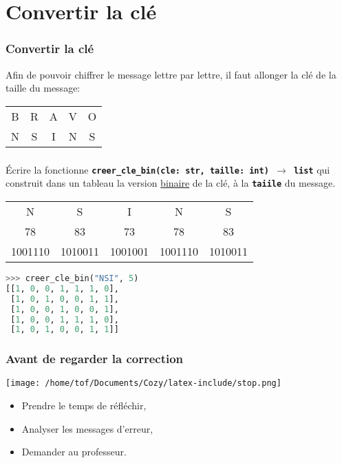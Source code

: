 \documentclass[svgnames,11pt]{beamer}
\begin{document}
\section{Convertir la clé}
\begin{frame}
    \frametitle{Convertir la clé}

    Afin de pouvoir chiffrer le message lettre par lettre, il faut allonger la clé de la taille du message:
    \begin{center}
        \begin{tabular}{*{5}{c}}
            B&R&A&V&O\\
            N&S&I&N&S\\
        \end{tabular}
    \end{center}
\end{frame}
\begin{frame}[fragile]
    \frametitle{}

    \begin{activite}
    Écrire la fonctionne \textbf{\texttt{creer\_cle\_bin(cle: str, taille: int) $\rightarrow$ list}} qui construit dans un tableau la version \underline{binaire} de la clé, à la \textbf{\texttt{taiile}} du message.
    \end{activite}
    \begin{center}
        \begin{tabular}{*{5}{c}}
            N&S&I&N&S\\
    
            78&83&73&78&83\\
            1001110&1010011&1001001&1001110&1010011\\
        \end{tabular}
\begin{lstlisting}[language=Python , basicstyle=\ttfamily\small, xleftmargin=0.2em, xrightmargin=0em]
>>> creer_cle_bin("NSI", 5)
[[1, 0, 0, 1, 1, 1, 0], 
 [1, 0, 1, 0, 0, 1, 1], 
 [1, 0, 0, 1, 0, 0, 1], 
 [1, 0, 0, 1, 1, 1, 0], 
 [1, 0, 1, 0, 0, 1, 1]]
\end{lstlisting}
\label{CODE}
\end{center}
\end{frame}
\begin{frame}
    \frametitle{Avant de regarder la correction}
\begin{center}
    \centering
    \texttt{[image: /home/tof/Documents/Cozy/latex-include/stop.png]}
    \end{center}
{\Large
    \begin{itemize}
        \item Prendre le temps de réfléchir,
        \item Analyser les messages d'erreur,
        \item Demander au professeur.
    \end{itemize}
}
\end{frame}
\end{document}
